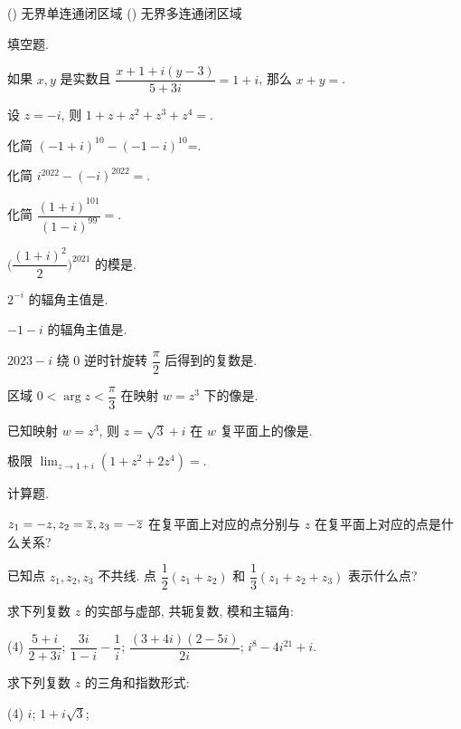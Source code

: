 \begin{homework}
\begin{exlist}
\begin{taskschoice}
          () 无界单连通闭区域
          () 无界多连通闭区域
        \end{taskschoice}
    \end{exlist}
  \item 填空题.
    \begin{exlist}
      \item 如果 $x,y$ 是实数且 $\dfrac{x+1+i(y-3)}{5+3i}=1+i$, 那么 $x+y=$\fillblank{}.
      \item 设 $z=-i$, 则 $1+z+z^2+z^3+z^4=$\fillblank{}.
      \item 化简 $(-1+i)^{10}-(-1-i)^{10}$=\fillblank{}.
      \item 化简 $i^{2022}-(-i)^{2022}=$\fillblank{}.
      \item 化简 $\dfrac{(1+i)^{101}}{(1-i)^{99}}=$\fillblank{}.
      \item $\biggl(\dfrac{(1+i)^2}2\biggr)^{2021}$ 的模是\fillblank{}.
      \item $2^{-i}$ 的辐角主值是\fillblank{}.
      \item $-1-i$ 的辐角主值是\fillblank{}.
      \item $2023-i$ 绕 $0$ 逆时针旋转 $\dfrac\pi2$ 后得到的复数是\fillblank{}.
      \item 区域 $0<\arg z<\dfrac\pi3$ 在映射 $w=z^3$ 下的像是\fillblank[4cm]{}.
      \item 已知映射 $w=z^3$, 则 $z=\sqrt3+i$ 在 $w$ 复平面上的像是\fillblank{}.
      \item 极限 $\displaystyle\lim_{z\to1+i}(1+z^2+2z^4)=$\fillblank{}.
    \end{exlist}
  \item 计算题.
    \begin{exlist}
      \item $z_1=-z,z_2=\overline z,z_3=-\overline{z}$ 在复平面上对应的点分别与 $z$ 在复平面上对应的点是什么关系?
      \item 已知点 $z_1,z_2,z_3$ 不共线. 点 $\dfrac12(z_1+z_2)$ 和 $\dfrac13(z_1+z_2+z_3)$ 表示什么点?
      \item 求下列复数 $z$ 的实部与虚部, 共轭复数, 模和主辐角:
        \begin{tasks}(4)
          \task $\dfrac{5+i}{2+3i}$;
          \task $\dfrac{3i}{1-i}-\dfrac1i$;
          \task $\dfrac{(3+4i)(2-5i)}{2i}$;
          \task $i^8-4i^{21}+i$.
        \end{tasks}
      \item 求下列复数 $z$ 的三角和指数形式:
        \begin{tasks}(4)
          \task $i$;
          \task $1+i\sqrt3$;

\end{tasks}
\end{exlist}
\end{homework}
